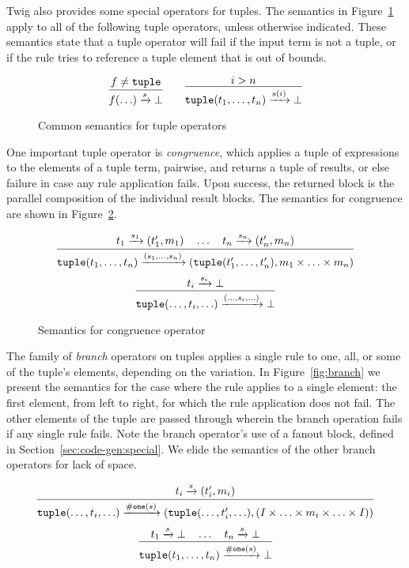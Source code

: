 Twig also provides some special operators for tuples. The semantics in Figure~\ref{fig:all-tuples} apply to all of the following tuple operators, unless otherwise indicated. These semantics state that a tuple operator will fail if the input term is not a tuple, or if the rule tries to reference a tuple element that is out of bounds.

\begin{figure}[ht]
\label{fig:all-tuples}
\[
\infer
  {f(\ldots) \arr{s} \bot}
  {f \neq \mathtt{tuple}}
\qquad
\infer
  {\mathtt{tuple}(t_1,\ldots,t_n) \arr{s(i)} \bot}
  {i > n}
\]
\caption{Common semantics for tuple operators}
\end{figure}

One important tuple operator is \emph{congruence}, which applies a tuple of expressions to the elements of a tuple term, pairwise, and returns a tuple of results, or else failure in case any rule application fails. Upon success, the returned block is the parallel composition of the individual result blocks. The semantics for congruence are shown in Figure~\ref{fig:congruence}.

\begin{figure}[ht]
\label{fig:congruence}
\[
\infer
  {\mathtt{tuple}(t_1,\ldots,t_n)\arr{(s_1,\ldots,s_n)} (\mathtt{tuple}(t_1',\ldots,t_n'),m_1 \times \ldots \times m_n) }
  {t_1 \arr{s_1} (t_1',m_1) \quad \ldots \quad t_n \arr{s_n} (t_n',m_n)}
\]
\[
\infer
  {\mathtt{tuple}(\ldots,t_i,\ldots)\arr{(\ldots,s_i,\ldots)}\bot}
  {t_i \arr{s_i} \bot}
\]
\caption{Semantics for congruence operator}
\end{figure}

The family of \emph{branch} operators on tuples applies a single rule to one, all, or some of the tuple's elements, depending on the variation. In Figure~\ref{fig:branch} we present the semantics for the case where the rule applies to a single element: the first element, from left to right, for which the rule application does not fail. The other elements of the tuple are passed through wherein the branch operation fails if any single rule fails. Note the branch operator's use of a fanout block, defined in Section~\ref{sec:code-gen:special}. We elide the semantics of the other branch operators for lack of space.

\begin{figure*}[ht]
\label{fig:branch}
\[
\infer
  {\mathtt{tuple}(\ldots,t_i,\ldots) \arr{\mathtt{\#one}(s)} (\mathtt{tuple}(\ldots,t_i',\ldots),(I \times \ldots \times m_i \times \ldots \times I))}
  {t_i \arr{s} (t_i',m_i)}
\]
\[
\infer
  {\mathtt{tuple}(t_1,\ldots,t_n) \arr{\mathtt{\#one}(s)} \bot}
  {t_1 \arr{s} \bot \quad \ldots \quad t_n \arr{s} \bot}
\]
\caption{Semantics for branch-one operator}
\end{figure*}

